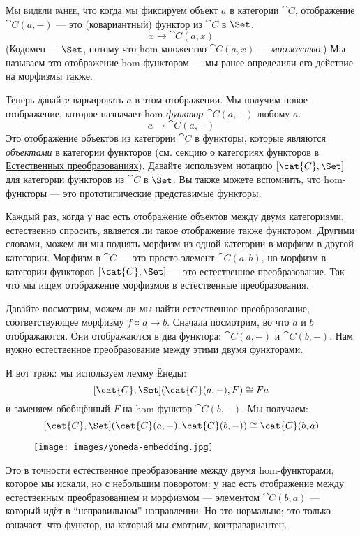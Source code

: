 
\lettrine[lhang=0.17]{М}{ы видели ранее}, что когда мы фиксируем объект $a$ в
категории $\cat{C}$, отображение $\cat{C}(a, -)$ --- это (ковариантный)
функтор из $\cat{C}$ в $\Set$.
\[x \to \cat{C}(a, x)\]
(Кодомен --- $\Set$, потому что hom-множество $\cat{C}(a, x)$ ---
\emph{множество}.) Мы называем это отображение hom-функтором --- мы ранее
определили его действие на морфизмы также.

Теперь давайте варьировать $a$ в этом отображении. Мы получим новое отображение, которое
назначает hom-\emph{функтор} $\cat{C}(a, -)$ любому $a$.
\[a \to \cat{C}(a, -)\]
Это отображение объектов из категории $\cat{C}$ в функторы, которые являются
\emph{объектами} в категории функторов (см. секцию о категориях
функторов в
\hyperref[natural-transformations]{Естественных
  преобразованиях}). Давайте используем нотацию $[\cat{C}, \Set]$ для
категории функторов из $\cat{C}$ в $\Set$. Вы также можете вспомнить, что
hom-функторы --- это прототипические
\hyperref[representable-functors]{представимые
  функторы}.

Каждый раз, когда у нас есть отображение объектов между двумя категориями,
естественно спросить, является ли такое отображение также функтором. Другими словами,
можем ли мы поднять морфизм из одной категории в морфизм в
другой категории. Морфизм в $\cat{C}$ --- это просто элемент
$\cat{C}(a, b)$, но морфизм в категории функторов
$[\cat{C}, \Set]$ --- это естественное преобразование. Так что мы ищем
отображение морфизмов в естественные преобразования.

Давайте посмотрим, можем ли мы найти естественное преобразование, соответствующее
морфизму $f \Colon a \to b$. Сначала посмотрим, во что
$a$ и $b$ отображаются. Они отображаются в два
функтора: $\cat{C}(a, -)$ и $\cat{C}(b, -)$. Нам нужно естественное
преобразование между этими двумя функторами.

И вот трюк: мы используем лемму Ёнеды:
\[[\cat{C}, \Set](\cat{C}(a, -), F) \cong F a\]
и заменяем обобщённый $F$ на hom-функтор
$\cat{C}(b, -)$. Мы получаем:
\[[\cat{C}, \Set](\cat{C}(a, -), \cat{C}(b, -)) \cong \cat{C}(b, a)\]
\begin{figure}[H]
  \centering
  \texttt{[image: images/yoneda-embedding.jpg]}
\end{figure}

\noindent
Это в точности естественное преобразование между двумя hom-функторами,
которое мы искали, но с небольшим поворотом: у нас есть отображение между
естественным преобразованием и морфизмом --- элементом
$\cat{C}(b, a)$ --- который идёт в ``неправильном'' направлении. Но это
нормально; это только означает, что функтор, на который мы смотрим, контравариантен.

